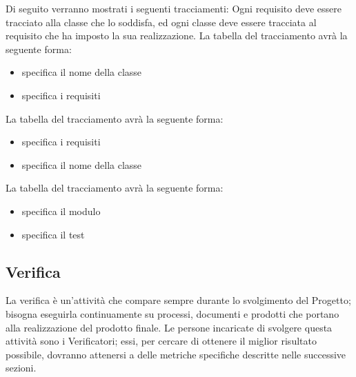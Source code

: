 Di seguito verranno mostrati i seguenti tracciamenti:
\label{}
Ogni requisito deve essere tracciato alla classe che lo soddisfa, ed ogni classe deve essere tracciata al requisito che ha imposto la sua realizzazione.
La tabella del tracciamento avrà la seguente forma:
\begin{itemize}
\item {}specifica il nome della classe
\item {}specifica i requisiti
\end{itemize}
La tabella del tracciamento avrà la seguente forma:
\begin{itemize}
\item {}specifica i requisiti
\item {}specifica il nome della classe
\end{itemize}
La tabella del tracciamento avrà la seguente forma:
\begin{itemize}
\item {}specifica il modulo
\item {}specifica il test
\end{itemize}


\newpage
\subsection{Verifica}
La verifica è un'attività che compare sempre durante lo svolgimento del Progetto; bisogna eseguirla continuamente su processi, documenti e prodotti che portano alla realizzazione del prodotto finale. Le persone incaricate di svolgere questa attività sono i Verificatori; essi, per cercare di ottenere il miglior risultato possibile, dovranno attenersi a delle metriche specifiche descritte nelle successive sezioni.
\label{11.0}

